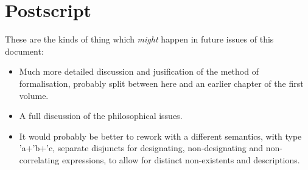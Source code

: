 
\section{Postscript}\label{POSTSCRIPT}

These are the kinds of thing which {\it might} happen in future issues of this document:

\begin{itemize}
\item Much more detailed discussion and jusification of the method of formalisation, probably split between here and an earlier chapter of the first volume.
\item A full discussion of the philosophical issues.
\item It would probably be better to rework with a different semantics, with type 'a+'b+'c, separate disjuncts for designating, non-designating and non-correlating expressions, to allow for distinct non-existents and descriptions. 
\end{itemize}

\pagebreak
\appendix

